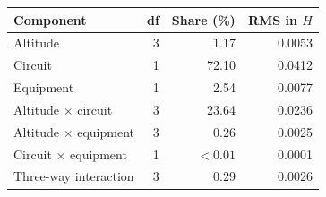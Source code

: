 \begin{tabular}{@{}lrrr@{}}
\toprule
Component & df & Share (\%) & RMS in $H$ \\
\midrule
Altitude & 3 & 1.17 & 0.0053 \\
Circuit & 1 & 72.10 & 0.0412 \\
Equipment & 1 & 2.54 & 0.0077 \\
Altitude $\times$ circuit & 3 & 23.64 & 0.0236 \\
Altitude $\times$ equipment & 3 & 0.26 & 0.0025 \\
Circuit $\times$ equipment & 1 & $<0.01$ & 0.0001 \\
Three-way interaction & 3 & 0.29 & 0.0026 \\
\bottomrule
\end{tabular}
